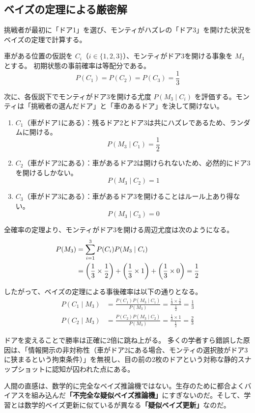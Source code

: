 \subsection{ベイズの定理による厳密解}
挑戦者が最初に「ドア1」を選び、モンティがハズレの「ドア3」を開けた状況をベイズの定理で計算する。

車がある位置の仮説を $C_i$（$i \in \{1, 2, 3\}$）、モンティがドア3を開ける事象を $M_3$ とする。
初期状態の事前確率は等配分である。
\begin{equation}
P(C_1) = P(C_2) = P(C_3) = \frac{1}{3}
\end{equation}

次に、各仮説下でモンティがドア3を開ける尤度 $P(M_3 \mid C_i)$ を評価する。モンティは「挑戦者の選んだドア」と「車のあるドア」を決して開けない。
\begin{enumerate}[label=(\roman*)]
  \item $C_1$（車がドア1にある）：残るドア2とドア3は共にハズレであるため、ランダムに開ける。
  \begin{equation}
  P(M_3 \mid C_1) = \frac{1}{2}
  \end{equation}
  \item $C_2$（車がドア2にある）：車があるドア2は開けられないため、必然的にドア3を開けるしかない。
  \begin{equation}
  P(M_3 \mid C_2) = 1
  \end{equation}
  \item $C_3$（車がドア3にある）：車があるドア3を開けることはルール上あり得ない。
  \begin{equation}
  P(M_3 \mid C_3) = 0
  \end{equation}
\end{enumerate}

全確率の定理より、モンティがドア3を開ける周辺尤度は次のようになる。
\begin{align}
P(M_3) &= \sum_{i=1}^3 P(C_i) P(M_3 \mid C_i) \notag \\
       &= \left(\frac{1}{3} \times \frac{1}{2}\right) + \left(\frac{1}{3} \times 1\right) + \left(\frac{1}{3} \times 0\right) = \frac{1}{2}
\end{align}

したがって、ベイズの定理による事後確率は以下の通りとなる。
\begin{align}
P(C_1 \mid M_3) &= \frac{P(C_1) P(M_3 \mid C_1)}{P(M_3)} = \frac{\frac{1}{3} \times \frac{1}{2}}{\frac{1}{2}} = \frac{1}{3} \\
P(C_2 \mid M_3) &= \frac{P(C_2) P(M_3 \mid C_2)}{P(M_3)} = \frac{\frac{1}{3} \times 1}{\frac{1}{2}} = \frac{2}{3}
\end{align}

ドアを変えることで勝率は正確に2倍に跳ね上がる。
多くの学者すら錯誤した原因は、「情報開示の非対称性（車がドア2にある場合、モンティの選択肢がドア3に狭まるという拘束条件）」を無視し、目の前の2枚のドアという対称な静的スナップショットに認知が囚われた点にある。

人間の直感は、数学的に完全なベイズ推論機ではない。生存のために都合よくバイアスを組み込んだ\textbf{「不完全な疑似ベイズ推論機」}にすぎないのだ。そして、学習とは数学的ベイズ更新に似ているが異なる\textbf{「疑似ベイズ更新」}なのだ。


